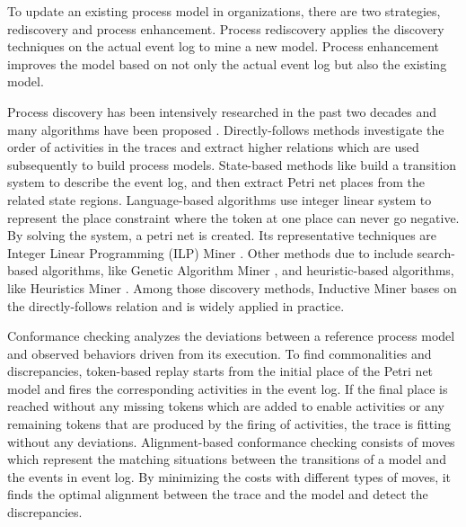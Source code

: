 To update an existing process model in organizations, there are two strategies, rediscovery and process enhancement. Process rediscovery applies the discovery techniques on the actual event log to mine a new model. Process enhancement improves the model based on not only the actual event log but also the existing model. 


Process discovery has been intensively researched in the past two decades and many algorithms have been proposed \cite{van2016data}. Directly-follows methods \cite{van2004workflow, leemans2013discovering} investigate the  order of activities in the traces and extract higher relations which are used subsequently to build process models. State-based methods like  \cite{bergenthum2007process, cortadella1995synthesizing}  build a transition system to describe the event log, and then extract Petri net places from the related state regions. Language-based algorithms use integer linear system to represent the place constraint where the token at one place can never go negative. By solving the system, a petri net is created. Its representative techniques are Integer Linear Programming (ILP) Miner \cite{van2008process}. Other methods due to  \cite{van2009process} include search-based algorithms, like Genetic Algorithm Miner \cite{de2007genetic}, and heuristic-based algorithms, like Heuristics Miner \cite{weijters2003rediscovering}. Among those discovery methods, Inductive Miner bases on the directly-follows relation and is widely applied \cite{leemans2013discovering} in practice. 

Conformance checking analyzes the deviations between a reference process model and observed behaviors driven from its execution.  To find commonalities and discrepancies, token-based replay starts from the initial place of the Petri net model and fires the corresponding activities in the event log. If the final place is reached without any missing tokens which are added to enable activities or any remaining tokens that are produced by the firing of activities, the trace is fitting without any deviations. Alignment-based conformance checking consists of moves which represent the  matching situations between the transitions of a  model and the events in event log. By minimizing the costs with different types of moves, it finds the optimal alignment between the trace and the model and detect the discrepancies.

